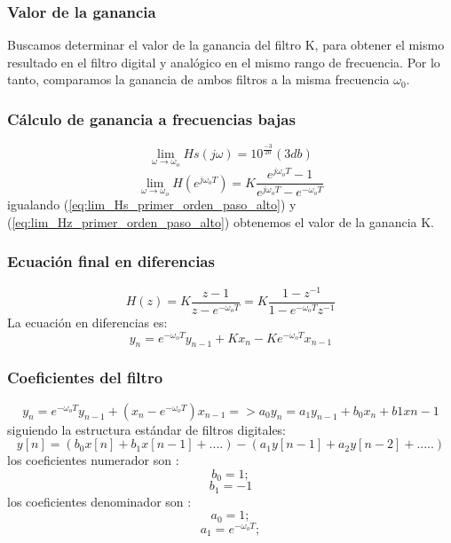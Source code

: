 \documentclass[titlepage]{article}
\begin{document}
\subsubsection{Valor de la ganancia}
Buscamos determinar el valor de la ganancia del filtro K, para obtener el mismo resultado en el filtro digital y analógico en el mismo rango de frecuencia. Por lo tanto, comparamos la ganancia de ambos filtros a la misma frecuencia $\omega_0$.

\subsubsection{Cálculo de ganancia a frecuencias bajas}
\begin{equation}
\label{eq:lim_Hs_primer_orden_paso_alto}\lim_{\omega \to \omega_o}Hs(j\omega)=10^\frac{-3}{20}(3db)
\end{equation}
\begin{equation}
\label{eq:lim_Hz_primer_orden_paso_alto}\lim_{\omega \to \omega_o}H(e^{j\omega_oT})=K\frac{e^{j\omega_oT} -1}{e^{j\omega_oT}-e^{-\omega_oT}}
\end{equation}
\quad igualando (\ref{eq:lim_Hs_primer_orden_paso_alto}) y (\ref{eq:lim_Hz_primer_orden_paso_alto}) obtenemos el valor de la ganancia K.


\subsubsection{Ecuación final en diferencias}
\begin{equation}
		H(z)=K\frac{z-1}{z-e^{-\omega_oT}} = K\frac{1 - z^{-1}}{1-e^{-\omega_oT}z^{-1}}
\end{equation}
La ecuación en diferencias es:
\begin{equation}
\label{eqn:dif_primer_orden_paso_alto}y_n=e^{-\omega_oT}y_{n-1}+ Kx_{n} - Ke^{-\omega_oT}x_{n-1}
\end{equation}
\subsubsection{Coeficientes del filtro}
\begin{equation}
y_n=e^{-\omega_oT}y_{n-1}+(x_{n}-e^{-\omega_oT})x_{n-1} => a_0y_{n}=a_1y_{n-1}+b_0x_n + b1x{n-1}
\end{equation}
siguiendo la estructura estándar de filtros digitales:
\begin{equation}
y[n]=(b_0x[n]+b_1x[n-1]+ ....)-(a_1y[n-1] + a_2y[n-2] + .....)  
\end{equation}
los coeficientes numerador son :
	\begin{equation}
		b_0=1;
	\end{equation}
	\begin{equation}
		b_1=-1
	\end{equation}
los coeficientes denominador son :
	\begin{equation}
		a_0=1;
	\end{equation}
	\begin{equation}
		a_1=e^{-\omega_oT};
	\end{equation}
\end{document}
